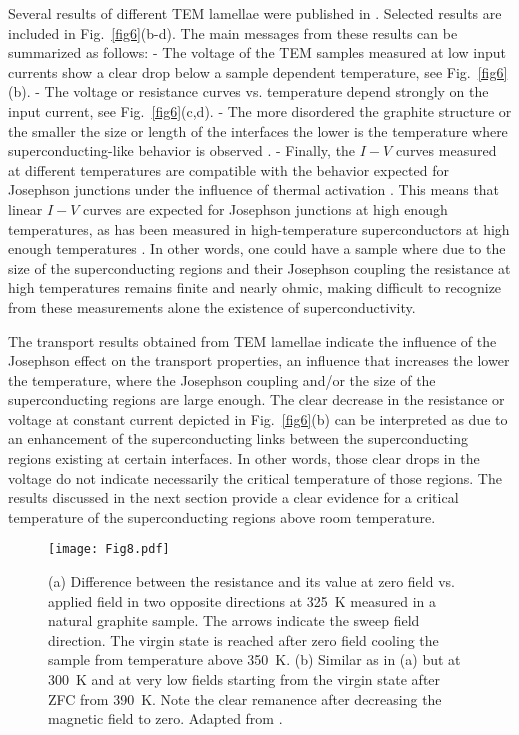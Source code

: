 \documentclass[aps,dvipsnames,twocolumn,floatfix,amsmath]{revtex4-1}
\begin{document}
Several results of different TEM lamellae were published in
\cite{bal13,bal15,bal14I}. Selected results are included in Fig.~\ref{fig6}(b-d). The main messages from
these results can be summarized as follows: - The voltage of the TEM samples measured at  low input
currents show a clear drop below a sample dependent temperature, see Fig.~\ref{fig6}(b). - The
voltage or resistance curves vs. temperature depend strongly on the input current, see Fig.~\ref{fig6}(c,d).
- The more disordered the graphite structure or the smaller the size or length of the interfaces
the lower is the temperature where superconducting-like  behavior is observed \cite{bar15,bal14I}. - Finally, the
$I-V$ curves measured at different temperatures \cite{bal13} are compatible with the behavior expected
for Josephson junctions under the influence of thermal activation \cite{amb69}. This means that linear
$I-V$ curves are expected for Josephson junctions at high enough temperatures, as has been measured
in high-temperature superconductors at high enough temperatures \cite{gro90}. In other words, one
could have a sample where due to the size of the superconducting regions and their Josephson coupling the
resistance at high temperatures remains finite and nearly ohmic, making difficult to recognize from these measurements
alone the existence of
superconductivity.




The transport results obtained from TEM lamellae indicate the influence of
the Josephson effect on the transport properties, an influence that increases the
lower the temperature, where the
Josephson coupling and/or the size of the superconducting regions are large
enough. The clear decrease in the resistance or voltage at constant current depicted in
Fig.~\ref{fig6}(b) can be interpreted as due to an enhancement of the superconducting
links between the superconducting regions existing at certain interfaces. In other words,
those clear drops in the voltage do not indicate necessarily the critical temperature
of those regions. The results discussed in the next section provide a clear evidence for a
critical temperature of the superconducting regions above room temperature.

\begin{figure*}
  \texttt{[image: Fig8.pdf]}
\caption{(a) Difference between the resistance and its value at
zero field vs. applied field in two opposite directions at 325~K
measured in a natural graphite sample. The arrows indicate the
sweep field direction. The virgin state is reached after zero
field cooling the sample from temperature above 350~K. (b) Similar
as in (a) but at 300~K and at very low fields  starting from the
virgin state after ZFC from 390~K. Note the clear remanence after
decreasing the magnetic field to zero. Adapted from \cite{pre16}.}
\label{fig8}       %
\end{figure*}
\end{document}
